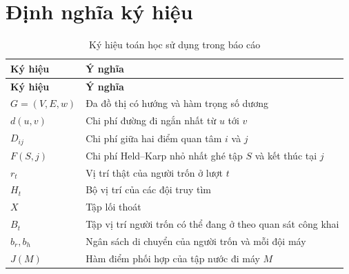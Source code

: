 \section{Định nghĩa ký hiệu}

\begin{longtable}{p{2.2cm}p{11.5cm}}
\caption{Ký hiệu toán học sử dụng trong báo cáo}\\
\toprule
\textbf{Ký hiệu} & \textbf{Ý nghĩa} \\
\midrule
\endfirsthead
\toprule
\textbf{Ký hiệu} & \textbf{Ý nghĩa} \\
\midrule
\endhead
$G=(V,E,w)$ & Đa đồ thị có hướng và hàm trọng số dương \\
$d(u,v)$ & Chi phí đường đi ngắn nhất từ $u$ tới $v$ \\
$D_{ij}$ & Chi phí giữa hai điểm quan tâm $i$ và $j$ \\
$F(S,j)$ & Chi phí Held--Karp nhỏ nhất ghé tập $S$ và kết thúc tại $j$ \\
$r_t$ & Vị trí thật của người trốn ở lượt $t$ \\
$H_t$ & Bộ vị trí của các đội truy tìm \\
$X$ & Tập lối thoát \\
$B_t$ & Tập vị trí người trốn có thể đang ở theo quan sát công khai \\
$b_r,b_h$ & Ngân sách di chuyển của người trốn và mỗi đội máy \\
$J(M)$ & Hàm điểm phối hợp của tập nước đi máy $M$ \\
\bottomrule
\end{longtable}

